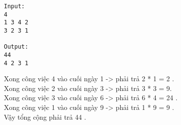 \begin{verbatim}
Input:
4
1 3 4 2
3 2 3 1

Output:
44
4 2 3 1 

\end{verbatim}

Xong công việc 4 vào cuối ngày 1 -> phải trả 2 * 1 = 2 .
\\Xong công việc 2 vào cuối ngày 3 -> phải trả 3 * 3 = 9.
\\Xong công việc 3 vào cuối ngày 6 -> phải trả 6 * 4 = 24 .
\\Xong công việc 1 vào cuối ngày 9 -> phải trả 1 * 9 = 9 .
\\Vậy tổng cộng phải trả 44 .